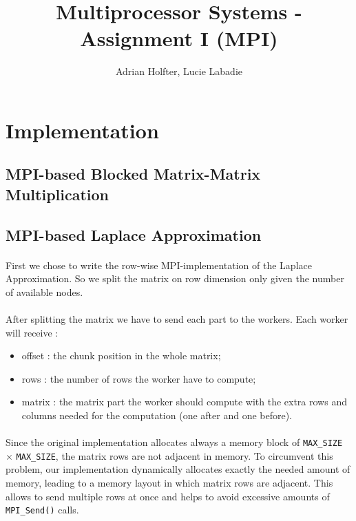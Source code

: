 \documentclass[]{article}
\title{Multiprocessor Systems - Assignment I (MPI)}
\author{Adrian Holfter, Lucie Labadie}
\begin{document}
\maketitle

\section{Implementation}

\subsection{MPI-based Blocked Matrix-Matrix Multiplication}

\subsection{MPI-based Laplace Approximation}

\paragraph{} First we chose to write the row-wise MPI-implementation of the Laplace Approximation. So we split the matrix on row dimension only given the number of available nodes.
\paragraph{} After splitting the matrix we have to send each part to the workers. Each worker will receive : 
\begin{itemize}
	\item offset : the chunk position in the whole matrix; 
	\item rows : the number of rows the worker have to compute;
	\item matrix : the matrix part the worker should compute with the extra rows and columns needed for the computation (one after and one before). 
\end{itemize}

\paragraph{} Since the original implementation allocates always a memory block of \texttt{MAX\_SIZE} $\times$ \texttt{MAX\_SIZE}, the matrix rows are not adjacent in memory. To circumvent this problem, our implementation dynamically allocates exactly the needed amount of memory, leading to a memory layout in which matrix rows are adjacent. This allows to send multiple rows at once and helps to avoid excessive amounts of \texttt{MPI\_Send()} calls.
\end{document}
